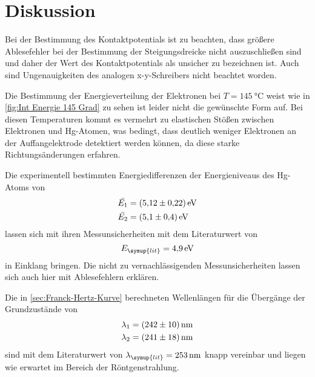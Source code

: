 \section{Diskussion}
\label{sec:Diskussion}
Bei der Bestimmung des Kontaktpotentials ist zu beachten, dass größere Ablesefehler bei der Bestimmung der Steigungsdreicke nicht
auszuschließen sind und daher der Wert des Kontaktpotentials als unsicher zu bezeichnen ist. Auch sind Ungenauigkeiten des analogen 
x-y-Schreibers nicht beachtet worden.

Die Bestimmung der Energieverteilung der Elektronen bei $T=\qty{145}{\celsius}$ weist wie in \autoref{fig:Int Energie 145 Grad} zu 
sehen ist leider nicht die gewünschte Form auf. Bei diesen Temperaturen kommt es vermehrt zu elastischen Stößen zwischen Elektronen
und Hg-Atomen, was bedingt, dass deutlich weniger Elektronen an der Auffangelektrode detektiert werden können, da diese starke
Richtungsänderungen erfahren.

Die experimentell bestimmten Energiedifferenzen der Energieniveaus des Hg-Atoms von
\begin{align*}
    \bar{E_1}&=\qty{5.12+-0.22}{\electronvolt} \\
    \bar{E_2}&=\qty{5.1+-0.4}{\electronvolt}
\end{align*}
lassen sich mit ihren Messunsicherheiten mit dem Literaturwert von
\begin{equation*}
    E_{\symup{lit}} = \qty{4,9}{\electronvolt}
\end{equation*}
in Einklang bringen. Die nicht zu vernachlässigenden Messunsicherheiten lassen sich auch hier mit Ablesefehlern erklären.

Die in \ref{sec:Franck-Hertz-Kurve} berechneten Wellenlängen für die Übergänge der Grundzustände von 
\begin{align*}
    \lambda_1&=\qty{242+-10}{\nano\meter} \\
    \lambda_2&=\qty{241+-18}{\nano\meter}
\end{align*}
sind mit dem Literaturwert von $\lambda_{\symup{lit}} = \qty{253}{\nano\meter}$ knapp vereinbar und liegen wie erwartet im Bereich
der Röntgenstrahlung.